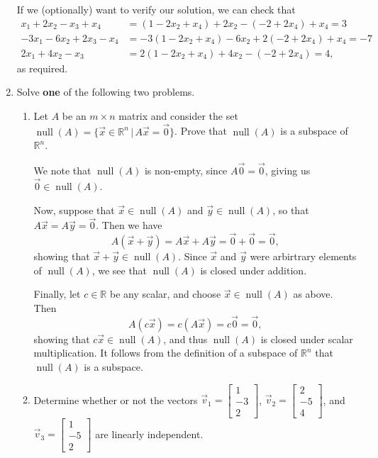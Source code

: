 \documentclass[12pt]{article}
\newcommand{\points}[1]{\marginpar{\hspace{24pt}[#1]}}
\newcommand{\R}{\mathbb{R}}
\newcommand{\bbm}{\begin{bmatrix}}
\newcommand{\ebm}{\end{bmatrix}}
\begin{document}
\begin{enumerate}
\medskip

If we (optionally) want to verify our solution, we can check that
\begin{align*}
 x_1+2x_2-x_3+x_4 &= (1-2x_2+x_4)+2x_2-(-2+2x_4)+x_4 = 3\\
-3x_1-6x_2+2x_3-x_4 &= -3(1-2x_2+x_4)-6x_2+2(-2+2x_4)+x_4 = -7\\
2x_1+4x_2-x_3 & = 2(1-2x_2+x_4)+4x_2-(-2+2x_4) = 4,
\end{align*}
as required.

\newpage

\item Solve \textbf{one} of the following two problems. \points{5}
\begin{enumerate}
 \item Let $A$ be an $m\times n$ matrix and consider the set $\operatorname{null}(A) = \{\vec{x}\in \R^n \,|\, A\vec{x} = \vec{0}\}$. Prove that $\operatorname{null}(A)$ is a subspace of $\R^n$.

\bigskip

We note that $\operatorname{null}(A)$ is non-empty, since $A\vec{0} = \vec{0}$, giving us $\vec{0}\in\operatorname{null}(A)$.

Now, suppose that $\vec{x}\in\operatorname{null}(A)$ and $\vec{y}\in\operatorname{null}(A)$, so that $A\vec{x}=A\vec{y}=\vec{0}$. Then we have
\[
 A(\vec{x}+\vec{y}) = A\vec{x}+A\vec{y} = \vec{0}+\vec{0} = \vec{0},
\]
showing that $\vec{x}+\vec{y}\in\operatorname{null}(A)$. Since $\vec{x}$ and $\vec{y}$ were arbirtrary elements of $\operatorname{null}(A)$, we see that $\operatorname{null}(A)$ is closed under addition.

Finally, let $c\in\R$ be any scalar, and choose $\vec{x}\in\operatorname{null}(A)$ as above. Then
\[
 A(c\vec{x}) = c(A\vec{x}) = c\vec{0} = \vec{0},
\]
showing that $c\vec{x}\in\operatorname{null}(A)$, and thus $\operatorname{null}(A)$ is closed under scalar multiplication. It follows from the definition of a subspace of $\R^n$ that $\operatorname{null}(A)$ is a subspace.

\bigskip


\item Determine whether or not the vectors $\vec{v}_1 = \bbm 1\\-3\\2\ebm$, $\vec{v}_2 = \bbm 2\\-5\\4\ebm$, and $\vec{v}_3 = \bbm 1\\-5\\2\ebm$ are linearly independent. 


\end{enumerate}
\end{enumerate}
\end{document}
